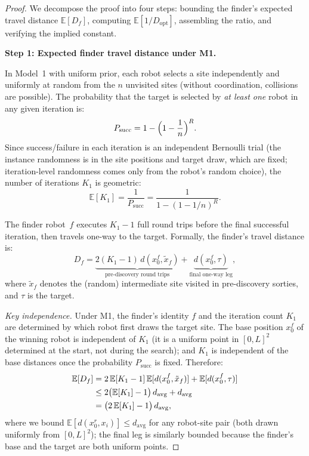 \begin{proof}
We decompose the proof into four steps: bounding the finder's expected
travel distance $\mathbb{E}[D_f]$, computing
$\mathbb{E}[1/D_{\mathrm{opt}}]$, assembling the ratio, and verifying
the implied constant.

\medskip
\noindent\textbf{Step 1: Expected finder travel distance under M1.}

In Model~1 with uniform prior, each robot selects a site independently
and uniformly at random from the $n$ unvisited sites (without coordination,
collisions are possible).
The probability that the target is selected by \emph{at least one} robot
in any given iteration is:
\begin{equation}
  P_{\mathrm{succ}} = 1 - \Bigl(1 - \frac{1}{n}\Bigr)^R.
\end{equation}
Since success/failure in each iteration is an independent Bernoulli trial
(the instance randomness is in the site positions and target draw, which are
fixed; iteration-level randomness comes only from the robot's random choice),
the number of iterations $K_1$ is geometric:
\begin{equation}
  \mathbb{E}[K_1] = \frac{1}{P_{\mathrm{succ}}}
  = \frac{1}{1-(1-1/n)^R}.
\end{equation}

The finder robot~$f$ executes $K_1 - 1$ full round trips before the
final successful iteration, then travels one-way to the target.
Formally, the finder's travel distance is:
\[
  D_f = \underbrace{2(K_1-1)\,d(x_0^f, \tilde{x}_f)}_{\text{pre-discovery round trips}}
        + \underbrace{d(x_0^f, \tau)}_{\text{final one-way leg}},
\]
where $\tilde{x}_f$ denotes the (random) intermediate site visited in
pre-discovery sorties, and $\tau$ is the target.

\emph{Key independence.}
Under M1, the finder's identity $f$ and the iteration count $K_1$ are
determined by which robot first draws the target site.
The base position $x_0^f$ of the winning robot is independent of $K_1$
(it is a uniform point in $[0,L]^2$ determined at the start, not during
the search); and $K_1$ is independent of the base distances once the
probability $P_{\mathrm{succ}}$ is fixed.
Therefore:
\begin{align}
  \mathbb{E}[D_f]
  &= 2\,\mathbb{E}[K_1-1]\,\mathbb{E}[d(x_0^f,\tilde{x}_f)]
     + \mathbb{E}[d(x_0^f,\tau)] \notag\\
  &\leq 2\bigl(\mathbb{E}[K_1]-1\bigr)\,d_{\mathrm{avg}}
     + d_{\mathrm{avg}} \notag\\
  &= \bigl(2\,\mathbb{E}[K_1] - 1\bigr)\,d_{\mathrm{avg}},
  \label{eq:ef-df-m1}
\end{align}
where we bound $\mathbb{E}[d(x_0^r, x_i)] \leq d_{\mathrm{avg}}$ for any
robot-site pair (both drawn uniformly from $[0,L]^2$); the final leg
is similarly bounded because the finder's base and the target are both
uniform points.


\end{proof}
